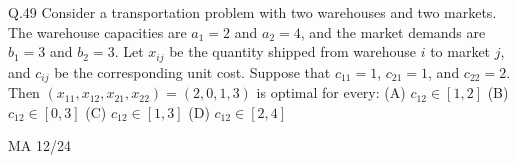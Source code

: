 \documentclass{article}
\begin{document}
																																																																																																	  \vspace{1em}
																																																																																																	  Q.49 \quad Consider a transportation problem with two warehouses and two markets. The warehouse capacities are $a_1 = 2$ and $a_2 = 4$, and the market demands are $b_1 = 3$ and $b_2 = 3$. Let $x_{ij}$ be the quantity shipped from warehouse $i$ to market $j$, and $c_{ij}$ be the corresponding unit cost. Suppose that $c_{11} = 1$, $c_{21} = 1$, and $c_{22} = 2$. Then $(x_{11}, x_{12}, x_{21}, x_{22}) = (2, 0, 1, 3)$ is optimal for every:
																																																																																																	   \vspace{1em}  \newline
																																																																																																	   \noindent (A)  $c_{12} \in [1, 2]$ \hspace{5.75cm} (B)  $c_{12} \in [0, 3]$
																																																																																																	   \newline \noindent (C)  $c_{12} \in [1, 3]$ \hspace{5cm}  (D) $c_{12} \in [2, 4]$
																																																																																																	   \vspace{8em}
																																																																																																	   \begin{center}
																																																																																																	       {MA 12/24}
																																																																																																	       \end{center}
\end{document}

